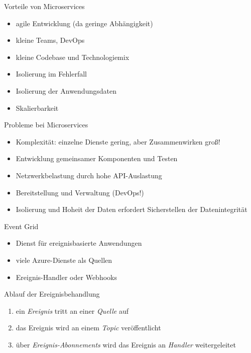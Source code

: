 \begin{flashcard}[]{Vorteile von Microservices}
  \begin{itemize}
    \item agile Entwicklung (da geringe Abhängigkeit)
    \item kleine Teams, DevOps
    \item kleine Codebase und Technologiemix
    \item Isolierung im Fehlerfall
    \item Isolierung der Anwendungsdaten
    \item Skalierbarkeit
  \end{itemize}
\end{flashcard}

\begin{flashcard}[]{Probleme bei Microservices}
  \begin{itemize}
    \item Komplexität: einzelne Dienste gering, aber Zusammenwirken groß!
    \item Entwicklung gemeinsamer Komponenten und Testen
    \item Netzwerkbelastung durch hohe API-Auslastung
    \item Bereitstellung und Verwaltung (DevOps!)
    \item Isolierung und Hoheit der Daten erfordert Sicherstellen der Datenintegrität
  \end{itemize}
\end{flashcard}

\begin{flashcard}[]{Event Grid}
  \begin{itemize}
    \item Dienst für ereignisbasierte Anwendungen
    \item viele Azure-Dienste als Quellen
    \item Ereignis-Handler oder Webhooks
  \end{itemize}
\end{flashcard}

\begin{flashcard}[]{Ablauf der Ereignisbehandlung}
  \begin{enumerate}
    \item ein \emph{Ereignis} tritt an einer \emph{Quelle} auf
    \item das Ereignis wird an einem \emph{Topic} veröffentlicht
    \item über \emph{Ereignis-Abonnements} wird das Ereignis an \emph{Handler} weitergeleitet
  \end{enumerate}
\end{flashcard}

